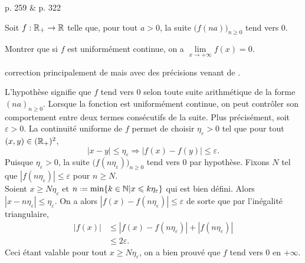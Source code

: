 \cite{exos_oraux} p. 259 \& \cite{oraux_x_ens_3} p. 322

\begin{lemme}
    Soit $f : \mathbb{R}_+ \to \mathbb{R}$ telle que, pour tout $a > 0$, la suite $\big(f(na) \big)_{n \geqslant 0}$ tend vers 0.
    \item Montrer que si $f$ est uniformément continue, on a $\lim\limits_{x \to + \infty} f(x) = 0$.
\end{lemme}

correction principalement de \cite{oraux_x_ens_3} mais avec des précisions venant de \cite{exos_oraux}.

\begin{preuve}
    L'hypothèse signifie que $f$ tend vers $0$ selon toute suite arithmétique de la forme $(na)_{n \geqslant 0}$. Lorsque la fonction est uniformément continue, on peut contrôler son comportement entre deux termes consécutifs de la suite. Plus précisément, soit $\varepsilon > 0$. La continuité uniforme de $f$ permet de choisir $\eta_\varepsilon > 0$ tel que pour tout $(x, y) \in (\mathbb{R}_+)^2$, 
    $$|x-y| \leqslant \eta_\varepsilon \Rightarrow |f(x) - f(y)| \leqslant \varepsilon.$$
    Puisque $\eta_\varepsilon > 0$, la suite $\big(f(n\eta_\varepsilon)\big)_{n \geqslant 0}$ tend vers $0$ par hypothèse. Fixons $N$ tel que $|f(n \eta_\varepsilon)| \leqslant \varepsilon$ pour $n \geqslant N$. \\
    Soient $x \geqslant N \eta_\varepsilon$ et $n \defeq \min\{ k \in \N | x \leqslant k \eta_\varepsilon \}$ qui est bien défini. Alors $|x-n\eta_\varepsilon| \leqslant \eta_\varepsilon$. On a alors $|f(x) - f(n \eta_\varepsilon)| \leqslant \varepsilon$ de sorte que par l'inégalité triangulaire, 
    \begin{align*}
        |f(x)| &\leqslant |f(x) - f(n \eta_\varepsilon)| + |f(n \eta_\varepsilon)| \\
        &\leqslant 2 \varepsilon.
    \end{align*}
    Ceci étant valable pour tout $x \geqslant N \eta_\varepsilon$, on a bien prouvé que $f$ tend vers $0$ en $+ \infty$.
\end{preuve}  

\begin{marginfigure}[-3cm]
    
\end{marginfigure}
